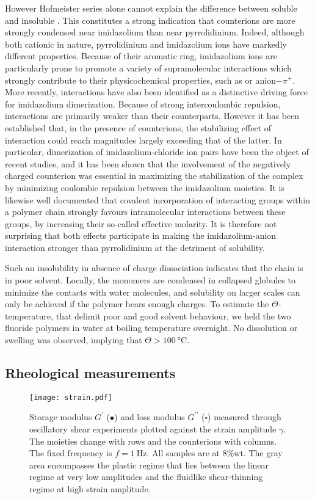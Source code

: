 \documentclass[twoside,twocolumn,9pt]{article}
\begin{document}
However Hofmeister series alone cannot explain the difference between soluble  and insoluble . This constitutes a strong indication that counterions are more strongly condensed near imidazolium than near pyrrolidinium. Indeed, although both cationic in nature, pyrrolidinium and imidazolium ions have markedly different properties. Because of their aromatic ring, imidazolium ions are particularly prone to promote a variety of supramolecular interactions which strongly contribute to their physicochemical properties, such as \ce{\pi+-\pi} or anion$-\pi^+$.  More recently, \ce{\pi+-\pi+} interactions have also been identified as a distinctive driving force for imidazolium dimerization\cite{Geronimo2011}. Because of strong intercoulombic repulsion, \ce{\pi+-\pi+} interactions are primarily weaker than their \ce{\pi-\pi} counterparts. However it has been established that, in the presence of counterions, the stabilizing effect of \ce{\pi+-\pi+} interaction could reach magnitudes largely exceeding that of the latter\cite{Geronimo2011}. In particular, dimerization of imidazolium-chloride ion pairs have been the object of recent studies, and it has been shown that the involvement of the negatively charged counterion was essential in maximizing the stabilization of the \ce{\pi+-\pi+} complex by minimizing coulombic repulsion between the imidazolium moieties\cite{Matthews2014,Gao2015a}. It is likewise well documented that covalent incorporation of interacting groups within a polymer chain strongly favours intramolecular interactions between these groups, by increasing their so-called effective molarity\cite{Li2003,Mulder2004,Huerta2013}. It is therefore not surprising that both effects participate in making the imidazolium-anion interaction stronger than pyrrolidinium at the detriment of solubility.

Such an insolubility in absence of charge dissociation indicates that the chain is in poor solvent. Locally, the monomers are condensed in collapsed globules to minimize the contacts with water molecules, and solubility on larger scales can only be achieved if the polymer bears enough charges\cite{Khokhlov1980,Raphael1990}. To estimate the $\Theta$-temperature, that delimit poor and good solvent behaviour, we held the two fluoride polymers in water at boiling temperature overnight. No dissolution or swelling was observed, implying that $\Theta>\SI{100}{\celsius}$.

\subsection{Rheological measurements}
\begin{figure*}
\texttt{[image: strain.pdf]}%
\caption{Storage modulus $G^\prime$ ($\bullet$) and loss modulus $G^{\prime\prime}$ ($\square$) measured through oscillatory shear experiments plotted against the strain amplitude $\gamma$. The moieties change with rows and the counterions with columns. The fixed frequency is $f=\SI{1}{\hertz}$. All samples are at 8\%wt. The gray area encompasses the plastic regime that lies between the linear regime at very low amplitudes and the fluidlike shear-thinning regime at high strain amplitude.}%
\label{fig:strain}%
\end{figure*}
\end{document}
